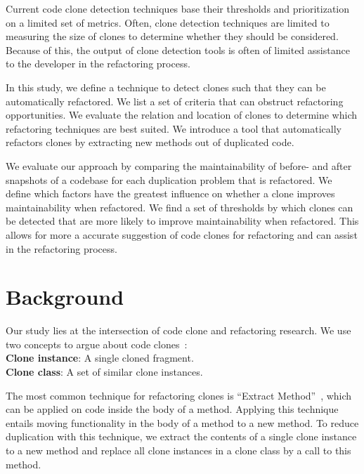 \documentclass[conference]{IEEEtran}
\begin{document}
Current code clone detection techniques base their thresholds and prioritization on a limited set of metrics. Often, clone detection techniques are limited to measuring the size of clones to determine whether they should be considered. Because of this, the output of clone detection tools is often of limited assistance to the developer in the refactoring process.

In this study, we define a technique to detect clones such that they can be automatically refactored. We list a set of criteria that can obstruct refactoring opportunities. We evaluate the relation and location of clones to determine which refactoring techniques are best suited. We introduce a tool that automatically refactors clones by extracting new methods out of duplicated code.

We evaluate our approach by comparing the maintainability of before- and after snapshots of a codebase for each duplication problem that is refactored. We define which factors have the greatest influence on whether a clone improves maintainability when refactored. We find a set of thresholds by which clones can be detected that are more likely to improve maintainability when refactored. This allows for more a accurate suggestion of code clones for refactoring and can assist in the refactoring process.

\section{Background}
Our study lies at the intersection of code clone and refactoring research. We use two concepts to argue about code clones~\cite{roy2007survey}:
\\ \textbf{Clone instance}: A single cloned fragment.
\\ \textbf{Clone class}: A set of similar clone instances.

The most common technique for refactoring clones is ``Extract Method''~\cite{fowler2018refactoring}, which can be applied on code inside the body of a method. Applying this technique entails moving functionality in the body of a method to a new method. To reduce duplication with this technique, we extract the contents of a single clone instance to a new method and replace all clone instances in a clone class by a call to this method.
\end{document}
